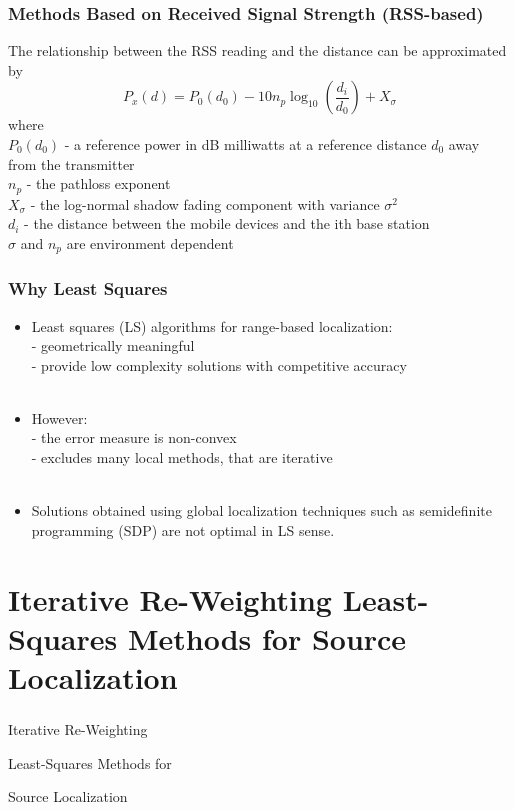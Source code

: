 \documentclass [t] {beamer} %
\begin{document}
\begin{frame} %
\frametitle{Methods Based on Received Signal Strength (RSS-based)}
\phantom{m}
The relationship between the RSS reading and the distance can be
approximated by
\begin{equation}
\nonumber
P_x(d) = P_0(d_0) - 10n_p\log_{10}\left( \frac{d_i}{d_0}\right) + X_{\sigma}
\end{equation}
where
\\
$P_0(d_0)$ - a reference power in dB milliwatts at a reference distance $d_0$ away from the transmitter
\\
$n_p$ - the pathloss exponent
\\
$X_{\sigma}$ - the log-normal shadow fading component with variance $\sigma^2$
\\
$d_i$ - the distance between the mobile devices and the ith base station
\\
$\sigma$ and $n_p$ are environment dependent
\end{frame}


\begin{frame} %
\frametitle{Why Least Squares}
\phantom{m}
\begin{itemize}
\item
Least squares (LS) algorithms for range-based localization:\\
- geometrically meaningful\\
- provide low complexity solutions with competitive accuracy
\\~\\
\item
However:\\
- the error measure is non-convex\\
- excludes many local methods, that are iterative
\\~\\
\item
Solutions obtained using global localization techniques such as
semidefinite programming (SDP) are not optimal in LS sense.
\end{itemize}
\end{frame}


\section[Chapter 2]{Iterative Re-Weighting Least-Squares Methods for Source Localization}


\begin{frame} [noframenumbering]
\frametitle{  }
\phantom{m} 
\phantom{m}
\phantom{m} 
\phantom{m}
\phantom{m} 
\phantom{m}
\Huge{\centerline{Iterative Re-Weighting}}

\Huge{\centerline{Least-Squares Methods for}}

\Huge{\centerline{Source Localization}}

\end{frame}
\end{document}

